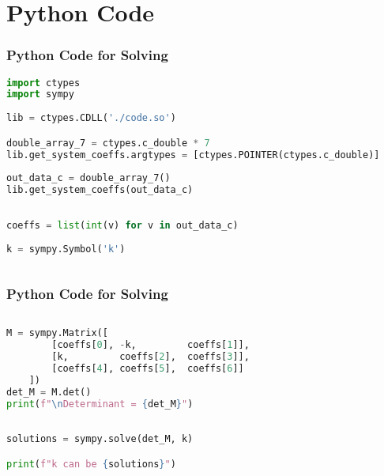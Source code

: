 \documentclass{beamer}
\theoremstyle{remark}
\numberwithin{equation}{section}
\begin{document}
\section{Python Code}
\begin{frame}[fragile]
\frametitle{Python Code for Solving}
\begin{lstlisting}[language=Python]
import ctypes
import sympy
 
lib = ctypes.CDLL('./code.so')

double_array_7 = ctypes.c_double * 7
lib.get_system_coeffs.argtypes = [ctypes.POINTER(ctypes.c_double)]
    
out_data_c = double_array_7()
lib.get_system_coeffs(out_data_c)
    
 
coeffs = list(int(v) for v in out_data_c)
 
k = sympy.Symbol('k')
    

\end{lstlisting}
\end{frame}
\begin{frame}[fragile]
\frametitle{Python Code for Solving}
\begin{lstlisting}[language=Python]
 
M = sympy.Matrix([
        [coeffs[0], -k,         coeffs[1]],  
        [k,         coeffs[2],  coeffs[3]],  
        [coeffs[4], coeffs[5],  coeffs[6]]  
    ])
det_M = M.det()
print(f"\nDeterminant = {det_M}")
    
     
solutions = sympy.solve(det_M, k)

print(f"k can be {solutions}")
\end{lstlisting}
\end{frame}
\end{document}
